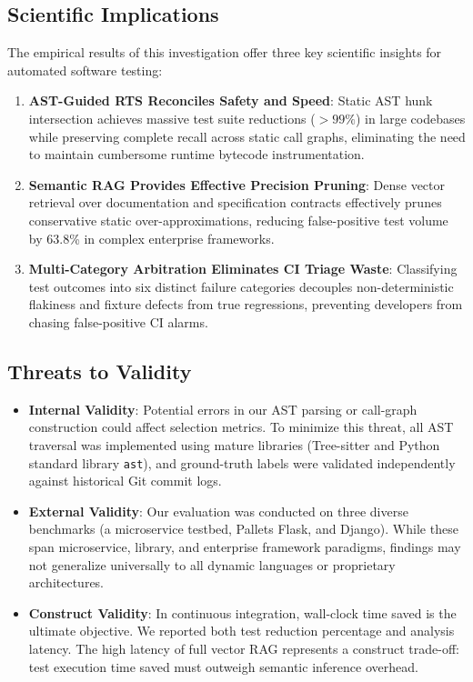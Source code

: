 \documentclass[12pt,onecolumn,draftclsnofoot]{IEEEtran}
\begin{document}
\subsection{Scientific Implications}
The empirical results of this investigation offer three key scientific insights for automated software testing:
\begin{enumerate}
    \item \textbf{AST-Guided RTS Reconciles Safety and Speed}: Static AST hunk intersection achieves massive test suite reductions ($>99\%$) in large codebases while preserving complete recall across static call graphs, eliminating the need to maintain cumbersome runtime bytecode instrumentation.
    \item \textbf{Semantic RAG Provides Effective Precision Pruning}: Dense vector retrieval over documentation and specification contracts effectively prunes conservative static over-approximations, reducing false-positive test volume by 63.8\% in complex enterprise frameworks.
    \item \textbf{Multi-Category Arbitration Eliminates CI Triage Waste}: Classifying test outcomes into six distinct failure categories decouples non-deterministic flakiness and fixture defects from true regressions, preventing developers from chasing false-positive CI alarms.
\end{enumerate}

\subsection{Threats to Validity}
\begin{itemize}
    \item \textbf{Internal Validity}: Potential errors in our AST parsing or call-graph construction could affect selection metrics. To minimize this threat, all AST traversal was implemented using mature libraries (Tree-sitter and Python standard library \texttt{ast}), and ground-truth labels were validated independently against historical Git commit logs.
    \item \textbf{External Validity}: Our evaluation was conducted on three diverse benchmarks (a microservice testbed, Pallets Flask, and Django). While these span microservice, library, and enterprise framework paradigms, findings may not generalize universally to all dynamic languages or proprietary architectures.
    \item \textbf{Construct Validity}: In continuous integration, wall-clock time saved is the ultimate objective. We reported both test reduction percentage and analysis latency. The high latency of full vector RAG represents a construct trade-off: test execution time saved must outweigh semantic inference overhead.
\end{itemize}
\end{document}
